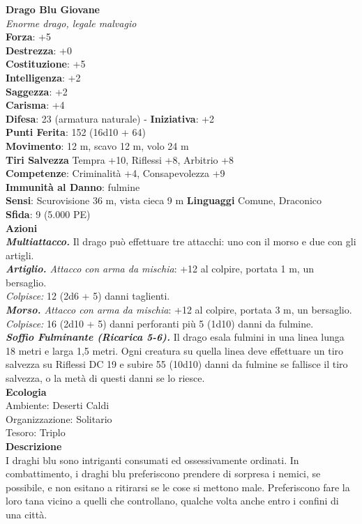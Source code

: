 \begin{multicols}{2}
\medskip\textbf{Drago Blu Giovane}\\
\emph{Enorme drago, legale malvagio}\\
\textbf{Forza}: +5\\
\textbf{Destrezza}: +0\\
\textbf{Costituzione}: +5\\
\textbf{Intelligenza}: +2\\
\textbf{Saggezza}: +2\\
\textbf{Carisma}: +4\\
\textbf{Difesa}: 23 (armatura naturale) - \textbf{Iniziativa}: +2\\
\textbf{Punti Ferita}: 152 (16d10 + 64)\\
\textbf{Movimento}: 12 m, scavo 12 m, volo 24 m\\
\textbf{Tiri Salvezza} Tempra +10, Riflessi +8, Arbitrio +8\\
\textbf{Competenze}: Criminalità +4, Consapevolezza +9\\
\textbf{Immunità al Danno}: fulmine\\
\textbf{Sensi}: Scurovisione 36 m, vista cieca 9 m
\textbf{Linguaggi} Comune, Draconico\\
\textbf{Sfida}: 9 (5.000 PE)\smallskip\\
\smallskip\textbf{Azioni}\\
\emph{\textbf{Multiattacco.}} Il drago può effettuare tre attacchi: uno con il morso e due con gli artigli.\\
\emph{\textbf{Artiglio.} Attacco con arma da mischia}: +12 al colpire, portata 1 m, un bersaglio.\\
\emph{Colpisce:} 12 (2d6 + 5) danni taglienti.\\
\emph{\textbf{Morso.} Attacco con arma da mischia}: +12 al colpire, portata 3 m, un bersaglio.\\
\emph{Colpisce:} 16 (2d10 + 5) danni perforanti più 5 (1d10) danni da fulmine.\\
\emph{\textbf{Soffio Fulminante (Ricarica 5-6).}} Il drago esala fulmini in una linea lunga 18 metri e larga 1,5 metri. Ogni creatura su quella linea deve effettuare un tiro salvezza su Riflessi DC  19 e subire 55 (10d10) danni da fulmine se fallisce il tiro salvezza, o la metà di questi danni se lo riesce.\\
\textbf{Ecologia}\\
Ambiente: Deserti Caldi\\
Organizzazione: Solitario\\
Tesoro: Triplo\\
\textbf{Descrizione}\\
I draghi blu sono intriganti consumati ed ossessivamente ordinati. In combattimento, i draghi blu preferiscono prendere di sorpresa i nemici, se possibile, e non esitano a ritirarsi se le cose si mettono male. Preferiscono fare la loro tana vicino a quelli che controllano, qualche volta anche entro i confini di una città.\\



\end{multicols}
